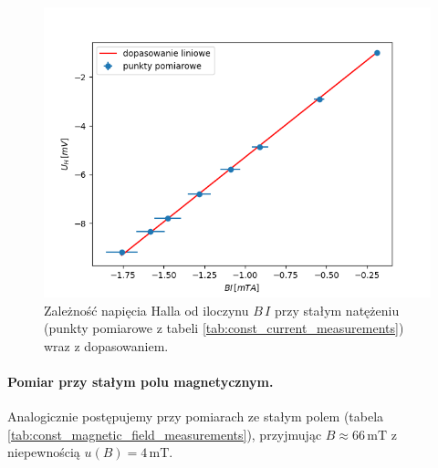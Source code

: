 \documentclass[12pt]{article}
\begin{document}
\begin{figure}[H]
    \centering
    \includegraphics[scale=0.5]{const_current}
    \caption{Zależność napięcia Halla od iloczynu $B\,I$ przy stałym natężeniu (punkty pomiarowe z tabeli \ref{tab:const_current_measurements}) wraz z dopasowaniem.}
    \label{fig:const_current_measuremnts}
\end{figure}

\paragraph{Pomiar przy stałym polu magnetycznym.}
Analogicznie postępujemy przy pomiarach ze stałym polem (tabela \ref{tab:const_magnetic_field_measurements}), przyjmując $B \approx 66 \,\mathrm{mT}$ z niepewnością $u(B)=4\,\mathrm{mT}$.
\end{document}
